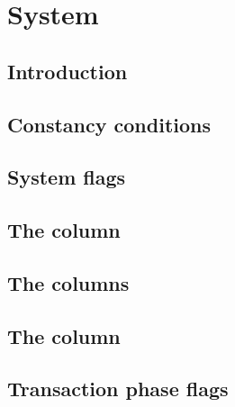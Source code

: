 \section{System}
\subsection{Introduction                         \lispNone{}}   \label{hub: system: intro}                     
\subsection{Constancy conditions                 \lispDone{}}   \label{hub: system: constancy conditions}      
\subsection{System flags                         }   \label{hub: system: system flags}               %
\subsection{The \blockNumber{} column            }   \label{hub: system: block number}               %
\subsection{The \xxxxTransactionNumber{} columns }   \label{hub: system: transaction numbers}        %
\subsection{The \hubStamp{} column               }   \label{hub: system: hub stamp}                  %
\subsection{Transaction phase flags              }   \label{hub: system: transaction phase flags}    %

